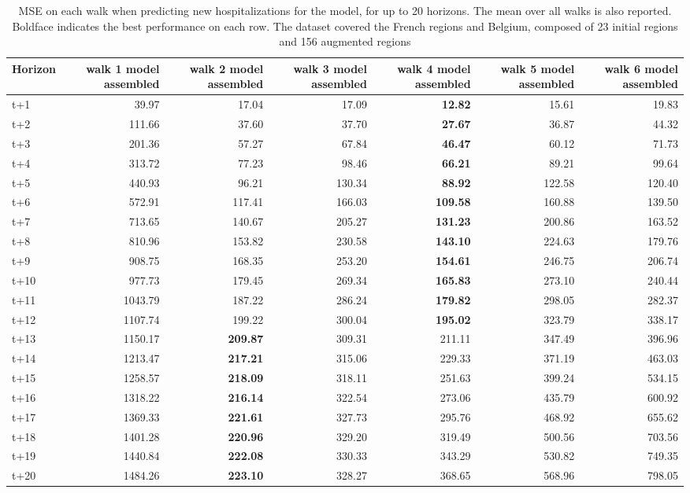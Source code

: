 \begin{table}[H]
\centering
\caption{MSE on each walk when predicting new hospitalizations for the model, for up to 20 horizons. The mean over all walks is also reported. Boldface indicates the best performance on each row. The dataset covered the French regions and Belgium, composed of 23 initial regions and 156 augmented regions }
\label{tab:MSE_walk_assembly}
\begin{tabular}{lrrrrrr}
\toprule
Horizon &  walk 1 model assembled &  walk 2 model assembled &  walk 3 model assembled &  walk 4 model assembled &  walk 5 model assembled &  walk 6 model assembled \\
\midrule
t+1  & 39.97  & 17.04  & 17.09  & \textbf{12.82}  & 15.61  & 19.83  \\
t+2  & 111.66  & 37.60  & 37.70  & \textbf{27.67}  & 36.87  & 44.32  \\
t+3  & 201.36  & 57.27  & 67.84  & \textbf{46.47}  & 60.12  & 71.73  \\
t+4  & 313.72  & 77.23  & 98.46  & \textbf{66.21}  & 89.21  & 99.64  \\
t+5  & 440.93  & 96.21  & 130.34  & \textbf{88.92}  & 122.58  & 120.40  \\
t+6  & 572.91  & 117.41  & 166.03  & \textbf{109.58}  & 160.88  & 139.50  \\
t+7  & 713.65  & 140.67  & 205.27  & \textbf{131.23}  & 200.86  & 163.52  \\
t+8  & 810.96  & 153.82  & 230.58  & \textbf{143.10}  & 224.63  & 179.76  \\
t+9  & 908.75  & 168.35  & 253.20  & \textbf{154.61}  & 246.75  & 206.74  \\
t+10  & 977.73  & 179.45  & 269.34  & \textbf{165.83}  & 273.10  & 240.44  \\
t+11  & 1043.79  & 187.22  & 286.24  & \textbf{179.82}  & 298.05  & 282.37  \\
t+12  & 1107.74  & 199.22  & 300.04  & \textbf{195.02}  & 323.79  & 338.17  \\
t+13  & 1150.17  & \textbf{209.87}  & 309.31  & 211.11  & 347.49  & 396.96  \\
t+14  & 1213.47  & \textbf{217.21}  & 315.06  & 229.33  & 371.19  & 463.03  \\
t+15  & 1258.57  & \textbf{218.09}  & 318.11  & 251.63  & 399.24  & 534.15  \\
t+16  & 1318.22  & \textbf{216.14}  & 322.54  & 273.06  & 435.79  & 600.92  \\
t+17  & 1369.33  & \textbf{221.61}  & 327.73  & 295.76  & 468.92  & 655.62  \\
t+18  & 1401.28  & \textbf{220.96}  & 329.20  & 319.49  & 500.56  & 703.56  \\
t+19  & 1440.84  & \textbf{222.08}  & 330.33  & 343.29  & 530.82  & 749.35  \\
t+20  & 1484.26  & \textbf{223.10}  & 328.27  & 368.65  & 568.96  & 798.05  \\

\bottomrule
\end{tabular}
\end{table}
